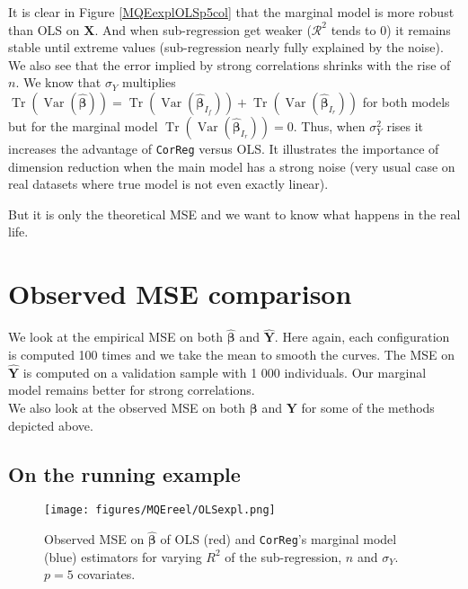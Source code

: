 \documentclass[12pt,a4paper]{report}
\begin{document}
It is clear in Figure \ref{MQEexplOLSp5col} that the marginal model is more robust than \textsc{OLS} on $\boldsymbol{X}$. And when sub-regression get weaker ($\mathcal{R}^2$ tends to 0) it remains stable until extreme values (sub-regression nearly fully explained by the noise). We also see that the error implied by strong correlations shrinks with the rise of $n$. 
We know that $\sigma_Y$ multiplies $\operatorname{Tr}(\operatorname{Var}(\hat{\boldsymbol{\beta}}))=\operatorname{Tr}(\operatorname{Var}(\hat{\boldsymbol{\beta}}_{I_f}))+\operatorname{Tr}(\operatorname{Var}(\hat{\boldsymbol{\beta}}_{I_r}))$ for both models but for the marginal model $\operatorname{Tr}(\operatorname{Var}(\hat{\boldsymbol{\beta}}_{I_r}))=0$.
 Thus, when $\sigma_Y^2$ rises it increases the advantage of {\tt CorReg} versus \textsc{OLS}. It illustrates the importance of dimension reduction when the main model has a strong noise (very usual case on real datasets where true model is not even exactly linear). 
 
But it is only the theoretical MSE and we want to know what happens in the real life. 
\section{Observed MSE comparison}
We look at the empirical MSE on both $\hat{\boldsymbol{\beta}}$ and $\hat{\boldsymbol{Y}}$. Here again, each configuration is computed 100 times and we take the mean to smooth the curves. The MSE on $\hat{\boldsymbol{Y}}$ is computed on a validation sample with 1 000 individuals. Our marginal model remains better for strong correlations.\\

	We also look at the observed MSE on both $\boldsymbol{\beta}$ and $\boldsymbol{Y}$ for some of the methods depicted above.
	\subsection{On the running example}
 \begin{figure}[h!]
	\texttt{[image: figures/MQEreel/OLSexpl.png]}
	\caption{Observed MSE on $\hat{\boldsymbol{\beta}}$ of OLS (red) and {\tt CorReg}'s marginal model (blue) estimators for varying $R^2$ of the sub-regression, $n$ and $\sigma_Y$. $p=5$ covariates.}\label{MSEOLSexpl}
\end{figure} 
	
\end{document}
